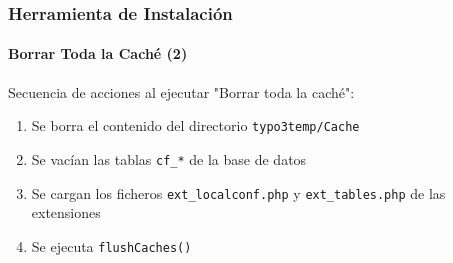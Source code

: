
\begin{frame}[fragile]
	\frametitle{Herramienta de Instalación}
	\framesubtitle{Borrar Toda la Caché (2)}

	Secuencia de acciones al ejecutar "Borrar toda la caché":

	\begin{enumerate}
		\item Se borra el contenido del directorio \texttt{typo3temp/Cache}
		\item Se vacían las tablas \texttt{cf\_*} de la base de datos
		\item Se cargan los ficheros \texttt{ext\_localconf.php} y \texttt{ext\_tables.php}\newline
			de las extensiones
		\item Se ejecuta \texttt{flushCaches()}
	\end{enumerate}

\end{frame}


